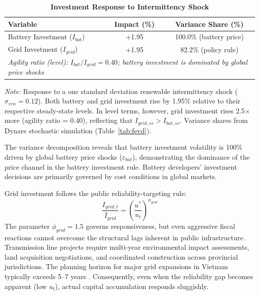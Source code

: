 \documentclass[12pt, a4paper]{article}
\begin{document}
	\begin{table}[H]
		\centering
		\caption{\textbf{Investment Response to Intermittency Shock}}
		\label{tab:agility_differential}
		\renewcommand{\arraystretch}{1.3}
		\begin{tabular}{l c c}
			\toprule
			\textbf{Variable} & \textbf{Impact (\%)} & \textbf{Variance Share (\%)} \\
			\midrule
			Battery Investment ($I_{bat}$) & +1.95 & 100.0\% (battery price) \\
			Grid Investment ($I_{grid}$) & +1.95 & 82.2\% (policy rule) \\
			\midrule
			\multicolumn{3}{p{13cm}}{\textit{Agility ratio (level): $I_{bat}/I_{grid} = 0.40$; battery investment is dominated by global price shocks}} \\
			\bottomrule
		\end{tabular}
		\vspace{0.2cm}
		\parbox{\textwidth}{\footnotesize \textit{Note:} Response to a one standard deviation renewable intermittency shock ($\sigma_{ren} = 0.12$). Both battery and grid investment rise by 1.95\% relative to their respective steady-state levels. In level terms, however, grid investment rises 2.5$\times$ more (agility ratio = 0.40), reflecting that $I_{grid,ss} > I_{bat,ss}$. Variance shares from Dynare stochastic simulation (Table~\ref{tab:fevd}).}
	\end{table}
	
	The variance decomposition reveals that battery investment volatility is 100\% driven by global battery price shocks ($\varepsilon_{bat}$), demonstrating the dominance of the price channel in the battery investment rule. Battery developers' investment decisions are primarily governed by cost conditions in global markets.
	
	Grid investment follows the public reliability-targeting rule:
	\begin{equation}
		\frac{I_{grid,t}}{\bar{I}_{grid}} = \left(\frac{u^*}{u_t}\right)^{\phi_{grid}}
	\end{equation}
	The parameter $\phi_{grid} = 1.5$ governs responsiveness, but even aggressive fiscal reactions cannot overcome the structural lags inherent in public infrastructure. Transmission line projects require multi-year environmental impact assessments, land acquisition negotiations, and coordinated construction across provincial jurisdictions. The planning horizon for major grid expansions in Vietnam typically exceeds 5--7 years \citep{iea2023}. Consequently, even when the reliability gap becomes apparent (low $u_t$), actual capital accumulation responds sluggishly.
	
\end{document}
